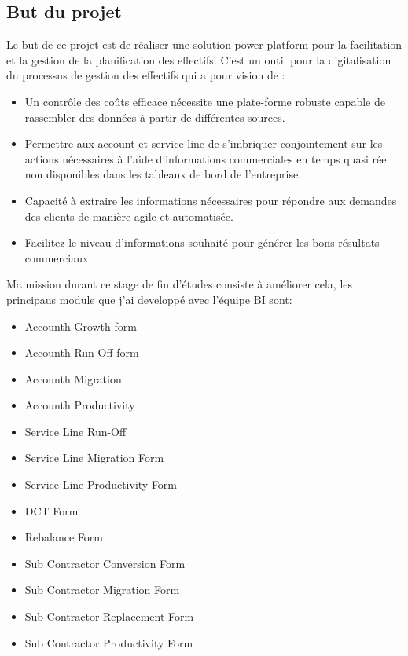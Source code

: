 \subsection{But du projet}

Le but de ce projet est de réaliser une solution power platform pour la facilitation et la gestion de la planification des effectifs. C’est un outil pour la digitalisation du processus de gestion des effectifs qui a pour vision de :

\begin{itemize}
  \item Un contrôle des coûts efficace nécessite une plate-forme robuste capable de rassembler des données à partir de différentes sources.
  \item Permettre aux account et service line de s'imbriquer conjointement sur les actions nécessaires à l'aide d'informations commerciales en temps quasi réel non disponibles dans les tableaux de bord de l'entreprise.
  \item Capacité à extraire les informations nécessaires pour répondre aux demandes des clients de manière agile et automatisée.
  \item Facilitez le niveau d'informations souhaité pour générer les bons résultats commerciaux.
\end{itemize}

Ma mission durant ce stage de fin d’études consiste à améliorer cela, les principaus module que j'ai developpé avec l'équipe BI sont:
\\
\begin{itemize}
  \item Accounth Growth form
  \item Accounth Run-Off form
  \item Accounth Migration
  \item Accounth Productivity
  \item Service Line Run-Off
  \item Service Line Migration Form
  \item Service Line Productivity Form
  \item DCT Form
  \item Rebalance Form
  \item Sub Contractor Conversion Form
  \item Sub Contractor Migration Form
  \item Sub Contractor Replacement Form
  \item Sub Contractor Productivity Form
\end{itemize}

